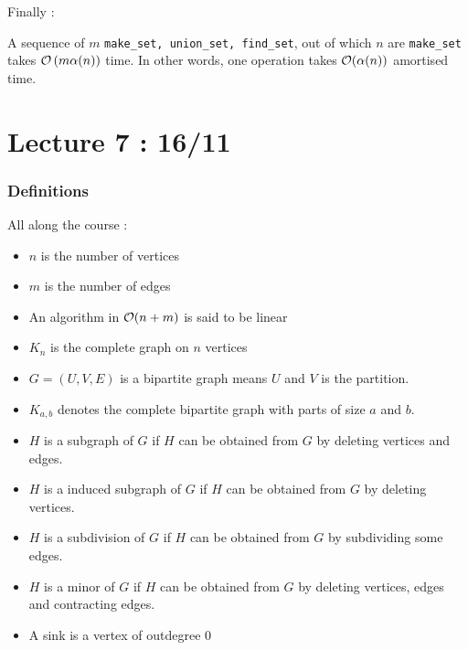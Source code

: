 \documentclass{cours}
\begin{document}
Finally : 

\begin{theorem}
    A sequence of $m$ \texttt{make\_set, union\_set, find\_set}, out of which $n$ are \texttt{make\_set} takes $\mathcal{O}\left(m \alpha(n)\right)$ time. In other words, one operation takes $\mathcal{O}(\alpha(n))$ amortised time.
\end{theorem}

\part[DFS-Matroids-MST]{Lecture 7 : 16/11}  %
\localtableofcontents
\section{Definitions}
All along the course : 
\begin{definition}
    \begin{itemize}
        \item $n$ is the number of vertices
        \item $m$ is the number of edges
        \item An algorithm in $\mathcal{O}(n + m)$ is said to be linear
        \item $K_{n}$ is the complete graph on $n$ vertices
        \item $G = \left(U, V, E\right)$ is a bipartite graph means $U$ and $V$ is the partition.
        \item $K_{a, b}$ denotes the complete bipartite graph with parts of size $a$ and $b$.
        \item $H$ is a subgraph of $G$ if $H$ can be obtained from $G$ by deleting vertices and edges.
        \item $H$ is a induced subgraph of $G$ if $H$ can be obtained from $G$ by deleting vertices.
        \item $H$ is a subdivision of $G$ if $H$ can be obtained  from $G$ by subdividing some edges.
        \item $H$ is a minor of $G$ if $H$ can be obtained from $G$ by deleting vertices, edges and contracting edges.
        \item A sink is a vertex of outdegree 0
    \end{itemize}
\end{definition}
\end{document}

